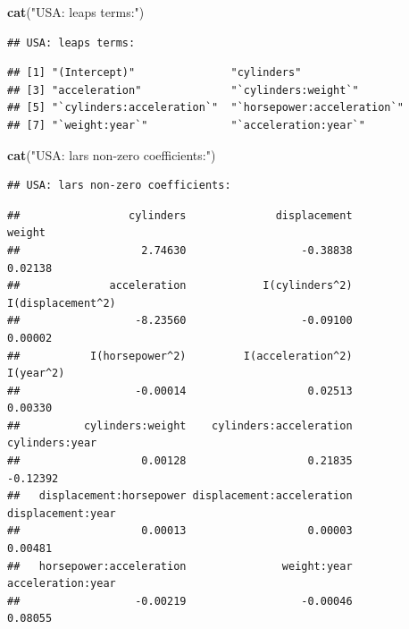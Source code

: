 \documentclass[
]{article}
\newenvironment{Shaded}{\begin{snugshade}}{\end{snugshade}}
\newcommand{\DecValTok}[1]{\textcolor[rgb]{0.00,0.00,0.81}{#1}}
\newcommand{\FunctionTok}[1]{\textcolor[rgb]{0.13,0.29,0.53}{\textbf{#1}}}
\newcommand{\NormalTok}[1]{#1}
\newcommand{\SpecialCharTok}[1]{\textcolor[rgb]{0.81,0.36,0.00}{\textbf{#1}}}
\newcommand{\StringTok}[1]{\textcolor[rgb]{0.31,0.60,0.02}{#1}}
\begin{document}
\begin{Shaded}
\begin{Highlighting}[]
\FunctionTok{cat}\NormalTok{(}\StringTok{"USA: leaps terms:"}\NormalTok{)}
\end{Highlighting}
\end{Shaded}

\begin{verbatim}
## USA: leaps terms:
\end{verbatim}

\begin{Shaded}
\end{Shaded}

\begin{verbatim}
## [1] "(Intercept)"               "cylinders"                
## [3] "acceleration"              "`cylinders:weight`"       
## [5] "`cylinders:acceleration`"  "`horsepower:acceleration`"
## [7] "`weight:year`"             "`acceleration:year`"
\end{verbatim}

\begin{Shaded}
\begin{Highlighting}[]
\FunctionTok{cat}\NormalTok{(}\StringTok{"USA: lars non{-}zero coefficients:"}\NormalTok{)}
\end{Highlighting}
\end{Shaded}

\begin{verbatim}
## USA: lars non-zero coefficients:
\end{verbatim}

\begin{Shaded}
\end{Shaded}

\begin{verbatim}
##                 cylinders              displacement                    weight 
##                   2.74630                  -0.38838                   0.02138 
##              acceleration            I(cylinders^2)         I(displacement^2) 
##                  -8.23560                  -0.09100                   0.00002 
##           I(horsepower^2)         I(acceleration^2)                 I(year^2) 
##                  -0.00014                   0.02513                   0.00330 
##          cylinders:weight    cylinders:acceleration            cylinders:year 
##                   0.00128                   0.21835                  -0.12392 
##   displacement:horsepower displacement:acceleration         displacement:year 
##                   0.00013                   0.00003                   0.00481 
##   horsepower:acceleration               weight:year         acceleration:year 
##                  -0.00219                  -0.00046                   0.08055
\end{verbatim}
\end{document}
